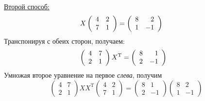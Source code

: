 \underline{Второй способ: } \\
$$ X \left(
\begin{array}{rr}
4 & 2 \\
7 & 1
\end{array}
\right) = \left(
\begin{array}{rr}
8 & 2 \\
1 & -1
\end{array} \right) \hspace*{0.5cm}$$
Транспонируя с обеих сторон, получаем:
\vspace*{0.2cm} \\
$$\left(
\begin{array}{rr}
4 & 7 \\
2 & 1
\end{array} \right) X^{\text{T}} = \left(
\begin{array}{rr}
8 & 1 \\
2 & -1
\end{array} \right) \hspace*{0.3cm}
$$
Умножая второе уравнение на первое \textit{слева}, получим
\vspace{0.2cm} \\
$$\left(
\begin{array}{rr}
4 & 7 \\
2 & 1
\end{array} \right) X X^{\text{T}} \left(
\begin{array}{rr}
4 & 2 \\
7 & 1
\end{array} \right) = \left(
\begin{array}{rr}
8 & 1 \\
2 & -1
\end{array} \right) \left(
\begin{array}{rr}
8 & 2 \\
1 & -1
\end{array} \right)
$$